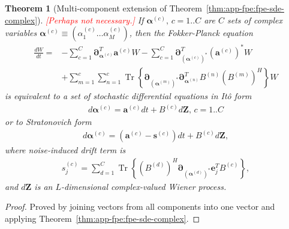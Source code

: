 \documentclass[12pt,aip,jmp,amssymb,amsmath]{revtex4-1}
\newcommand{\todo}[1]{\textcolor{red}{[#1]}}
\newcommand{\Zvec}{\boldsymbol{Z}}
\newcommand{\Trace}[1]{\operatorname{Tr} \left\{ #1 \right\}}
\newcommand{\thmref}[1]{Theorem~\ref{thm:#1}}
\newtheorem{theorem}{Theorem}
\begin{document}
\begin{theorem}[Multi-component extension of \thmref{app-fpe:fpe-sde-complex}]
\label{thm:app-fpe:mc-fpe-sde}
    \todo{Perhaps not necessary.}
    If $\boldsymbol{\alpha}^{(c)},\, c = 1..C$ are $C$ sets of complex variables $\boldsymbol{\alpha}^{(c)} \equiv (\alpha_1^{(c)} \ldots \alpha_M^{(c)})$, then the Fokker-Planck equation
    \begin{equation}\begin{split}
        \frac{dW}{dt}
        = & - \sum_{c=1}^C \boldsymbol{\partial}_{\boldsymbol{\alpha}^{(c)}}^T \boldsymbol{a}^{(c)} W
        - \sum_{c=1}^C \boldsymbol{\partial}_{(\boldsymbol{\alpha}^{(c)})^*}^T (\boldsymbol{a}^{(c)})^* W \\
        & + \sum_{m=1}^c \sum_{n=1}^c
            \Trace{
                \boldsymbol{\partial}_{(\boldsymbol{\alpha}^{(m)})^*}
                \boldsymbol{\partial}_{\boldsymbol{\alpha}^{(n)}}^T
                B^{(n)} (B^{(m)})^H
            } W
    \end{split}\end{equation}
    is equivalent to a set of stochastic differential equations in It\^{o} form
    \begin{equation}\begin{split}
        d\boldsymbol{\alpha}^{(c)} = \boldsymbol{a}^{(c)} dt + B^{(c)} d\Zvec,\, c = 1..C
    \end{split}\end{equation}
    or to Stratonovich form
    \begin{equation*}\begin{split}
        d\boldsymbol{\alpha}^{(c)} = (\boldsymbol{a}^{(c)} - \boldsymbol{s}^{(c)}) dt + B^{(c)} d\Zvec,
    \end{split}\end{equation*}
    where noise-induced drift term is
    \begin{equation*}\begin{split}
        s_j^{(c)} = \sum_{d=1}^C
            \Trace{ (B^{(d)})^H \boldsymbol{\partial}_{(\boldsymbol{\alpha}^{(d)})^*} \boldsymbol{e}_j^T B^{(c)} },
    \end{split}\end{equation*}
    and $d\Zvec$ is an $L$-dimensional complex-valued Wiener process.
\end{theorem}
\begin{proof}
Proved by joining vectors from all components into one vector and applying \thmref{app-fpe:fpe-sde-complex}.
\end{proof}
\end{document}
